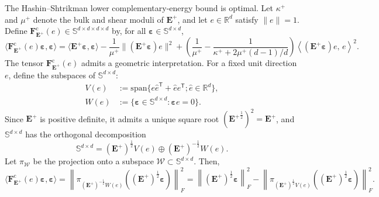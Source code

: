\documentclass[preprint,3p]{elsarticle}
\newcommand{\tens}[1]{\bm{\mathit{#1}}}             %
\newcommand{\tenss}[1]{\bm{\mathbf{#1}}}            %
\newcommand{\tensf}[1]{\bm{\mathbf{#1}}}            %
\newcommand{\trn}{\mathsf{T}}                       %
\newcommand{\strain}{\tenss{\varepsilon}}           %
\newcommand{\Emax}{\tensf{E}^{+}}                   %
\begin{document}
The Hashin--Shtrikman lower complementary-energy bound is optimal. Let $\kappa^+$ and $\mu^+$ denote the bulk and shear moduli of $\Emax$, and let $\tens{e}\in\mathbb{R}^{d}$ satisfy $\lVert\tens{e}\rVert=1$. Define $\tensf{F}_{\Emax}^\mathrm{c}(\tens{e})\in\mathbb{S}^{d\times d\times d\times d}$ by, for all $\strain\in\mathbb{S}^{d\times d}$,
%
\begin{equation}
    \langle \tensf{F}_{\Emax}^\mathrm{c}(\tens{e})\strain,\strain\rangle = \langle \Emax\strain,\strain\rangle-\frac{1}{\mu^+}\lVert(\Emax\strain)\tens{e}\rVert^2+
    \left(\frac{1}{\mu^+} - \frac{1}{\kappa^+ + 2 \mu^+ (d - 1)/d}\right)
    \left\langle (\Emax\strain)\tens{e},\, \tens{e}\right\rangle^2. 
\end{equation}
%
The tensor $\tensf{F}_{\Emax}^\mathrm{c}(\tens{e})$ admits a geometric interpretation. For a fixed unit direction $\tens{e}$, define the subspaces of $\mathbb{S}^{d\times d}$:
%
\begin{align}
    V(\tens{e})&:=\mathrm{span}\{\tens{e}\hat{\tens{e}}^\trn+\hat{\tens{e}}{\tens{e}}^\trn;\hat{\tens{e}}\in\mathbb{R}^d\},\\
    W(\tens{e})&:=\{\strain\in\mathbb{S}^{d\times d}:\strain\tens{e}=\tens{0}\}.
\end{align}
%
Since $\Emax$ is positive definite, it admits a unique square root $\left({\Emax}^{\frac{1}{2}}\right)^2=\Emax$, and $\mathbb{S}^{d\times d}$ has the orthogonal decomposition
%
$$
    \mathbb{S}^{d\times d}=(\Emax)^{\frac{1}{2}}V(\tens{e})\oplus(\Emax)^{-\frac{1}{2}}W(\tens{e}).
$$
%
Let $\pi_{\mathcal{W}}$ be the projection onto a subspace $\mathcal{W}\subset\mathbb{S}^{d\times d}$. Then,
%
$$
    \langle \tensf{F}_{\Emax}^\mathrm{c}(\tens{e})\strain,\strain\rangle = \left\lVert\pi_{(\Emax)^{-\frac{1}{2}}W(\tens{e})}\left((\Emax)^{\frac{1}{2}}\strain\right)\right\rVert_F^2=\left\lVert(\Emax)^{\frac{1}{2}}\strain\right\rVert_F^2-\left\lVert\pi_{(\Emax)^{\frac{1}{2}}V(\tens{e})}\left((\Emax)^{\frac{1}{2}}\strain\right)\right\rVert_F^2.
$$
%
\end{document}

